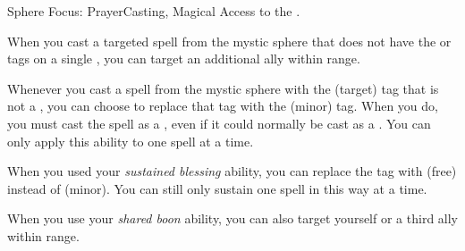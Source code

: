     \begin{magicalfeat}{Sphere Focus: Prayer}{Casting, Magical}
        \featpre Access to the  .

         When you cast a targeted spell from the  mystic sphere that does not have the  or  tags on a single , you can target an additional ally within range.

         Whenever you cast a spell from the  mystic sphere with the  (target) tag that is not a , you can choose to replace that tag with the  (minor) tag.
        When you do, you must cast the spell as a , even if it could normally be cast as a .
        You can only apply this ability to one spell at a time.

         When you used your \textit{sustained blessing} ability, you can replace the tag with  (free) instead of  (minor).
        You can still only sustain one spell in this way at a time.

         When you use your \textit{shared boon} ability, you can also target yourself or a third ally within range.
    \end{magicalfeat}

